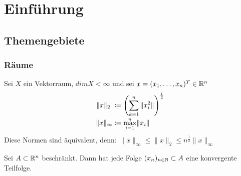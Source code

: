 \chapter*{Einf{\"u}hrung} 
  
  
  
\section{Themengebiete}



\subsection*{R{\"a}ume}


Sei $X$ ein Vektorraum, $dim X < \infty $ und sei $x = (x_{1},\dotsc,x_{n})^{T} \in \mathbb{R}^{n}$
\begin{align*}
	\|x\|_{2}~ & \coloneqq \left(\sum_{k = 1}^{n} \|x_{i}^{2}\| \right)^{\frac{1}{2}}\\
	\|x\|_{\infty} & \coloneqq \smash{\displaystyle\max_{i = 1}^{n}}  \|x_{i}\|	
\end{align*}	

Diese Normen sind äquivalent, denn:
$\| x \|_{\infty} \leq \| x \|_{2} \leq n^{\frac{1}{2}} \| x \|_{\infty}$ 

\begin{satz}  \label{satz:1.1-BolzanoWeierstrass}
Sei $A \subset \mathbb{R}^{n}$ beschränkt. Dann hat jede Folge $(x_{n})_{n \in \mathbb{N}} \subset A$ eine konvergente Teilfolge.
\end{satz}


